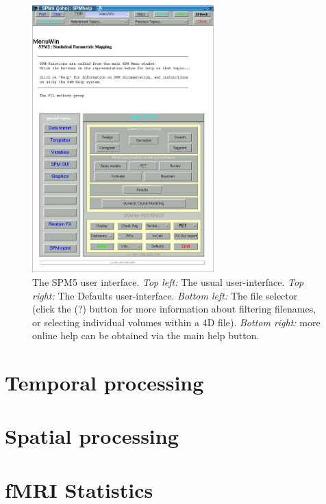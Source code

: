 \documentclass[a4paper,titlepage]{book}
\begin{document}
\begin{figure}
\begin{center}
\includegraphics[width=70mm]{images/ui4}
\end{center}
\caption{The SPM5 user interface. \emph{Top left:} The usual user-interface.  \emph{Top right:} The Defaults user-interface. \emph{Bottom left:} The file selector (click the (?) button for more information about filtering filenames, or selecting individual volumes within a 4D file). \emph{Bottom right:} more online help can be obtained via the main help button.}
\end{figure}


\part{Temporal processing}


%

\part{Spatial processing}








\part{fMRI Statistics}



%

\end{document}
